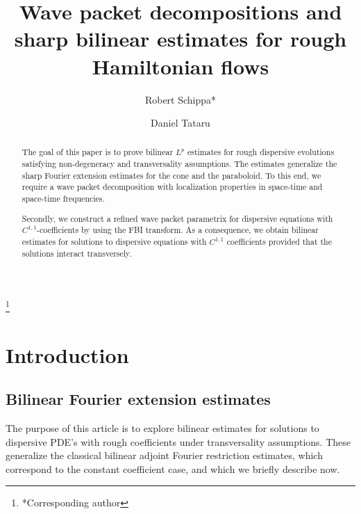 \documentclass{amsart}
\theoremstyle{definition}
\begin{document}
\title[Wave packet decompositions and bilinear estimates]{Wave packet decompositions and sharp bilinear estimates for rough Hamiltonian flows}

\author[Robert Schippa]{Robert Schippa*}
\address{University of Bonn, Mathematical Institute, Endenicher Allee 60, D-53115 Bonn, Germany}

\author{Daniel Tataru}
\address{UC Berkeley, Department of Mathematics, Evans Hall
Berkeley, CA 94720-3840, United States}


\begin{abstract}
The goal of this paper is to prove bilinear $L^p$ estimates for rough dispersive evolutions satisfying non-degeneracy and transversality assumptions. The estimates generalize the sharp Fourier extension estimates for the cone and the paraboloid. To this end, we require a wave packet decomposition with localization properties in space-time and space-time frequencies. 

Secondly, we construct a refined wave packet parametrix for dispersive equations with $C^{1,1}$-coefficients by using the FBI transform. As a consequence, we obtain bilinear estimates for solutions to dispersive equations with $C^{1,1}$ coefficients provided that the solutions interact transversely.
\end{abstract}
\thanks{*Corresponding author}

\maketitle

\setcounter{tocdepth}{1}
\tableofcontents

\section{Introduction}

\subsection{Bilinear Fourier extension estimates}
The purpose of this article is to explore bilinear estimates for solutions to dispersive PDE's with rough coefficients under transversality assumptions. These generalize the classical bilinear adjoint Fourier restriction estimates, which correspond to the constant coefficient case, and which we briefly describe now.
\end{document}
